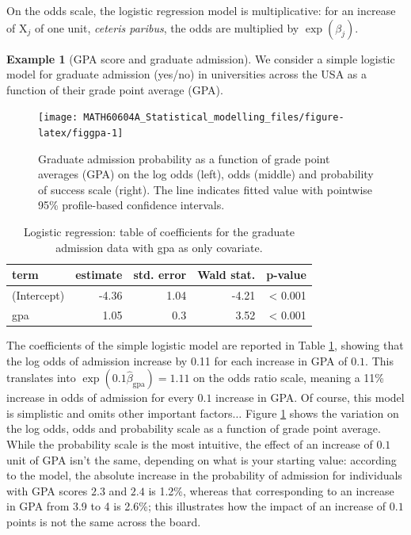 \documentclass[
  11pt,
  letterpaper,
]{book}
\theoremstyle{definition}
\theoremstyle{definition}
\newtheorem{example}{Example}[chapter]
\theoremstyle{definition}
\theoremstyle{definition}
\theoremstyle{remark}
\begin{document}
On the odds scale, the logistic regression model is multiplicative: for an increase of \(\mathrm{X}_j\) of one unit, \emph{ceteris paribus}, the odds are multiplied by \(\exp(\beta_j)\).

\begin{example}[GPA score and graduate admission]
\protect\hypertarget{exm:gpaexample}{}\label{exm:gpaexample}We consider a simple logistic model for graduate admission (yes/no) in universities across the USA as a function of their grade point average (GPA).
\end{example}

\begin{figure}

{\centering \texttt{[image: MATH60604A\_Statistical\_modelling\_files/figure-latex/figgpa-1]} 

}

\caption{Graduate admission probability as a function of grade point averages (GPA) on the log odds (left), odds (middle) and probability of success scale (right). The line indicates fitted value with pointwise 95\% profile-based confidence intervals.}\label{fig:figgpa}
\end{figure}

\begin{table}

\caption{\label{tab:gpatable}Logistic regression: table of coefficients for the graduate admission data with gpa as only covariate.}
\centering
\begin{tabular}[t]{lrrrr}
\toprule
term & estimate & std. error & Wald stat. & p-value\\
\midrule
(Intercept) & -4.36 & 1.04 & -4.21 & < 0.001\\
gpa & 1.05 & 0.3 & 3.52 & < 0.001\\
\bottomrule
\end{tabular}
\end{table}

The coefficients of the simple logistic model are reported in Table \ref{tab:gpatable}, showing that the log odds of admission increase by 0.11 for each increase in GPA of \(0.1\). This translates into \(\exp(0.1\widehat{\beta}_{\mathrm{gpa}})=1.11\) on the odds ratio scale, meaning a 11\% increase in odds of admission for every \(0.1\) increase in GPA. Of course, this model is simplistic and omits other important factors\(\ldots\) Figure \ref{fig:figgpa} shows the variation on the log odds, odds and probability scale as a function of grade point average. While the probability scale is the most intuitive, the effect of an increase of \(0.1\) unit of GPA isn't the same, depending on what is your starting value: according to the model, the absolute increase in the probability of admission for individuals with GPA scores \(2.3\) and \(2.4\) is 1.2\%, whereas that corresponding to an increase in GPA from 3.9 to 4 is 2.6\%; this illustrates how the impact of an increase of \(0.1\) points is not the same across the board.
\end{document}
